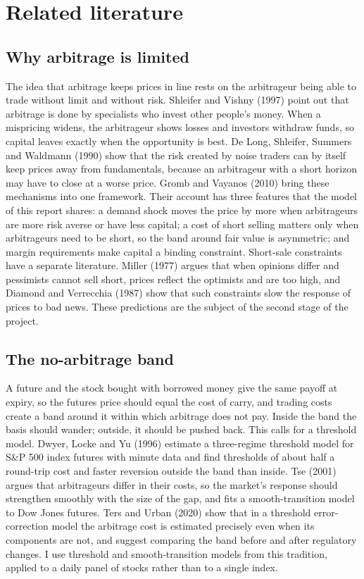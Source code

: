 \section{Related literature}\label{sec:lit}

\subsection{Why arbitrage is limited}
The idea that arbitrage keeps prices in line rests on the arbitrageur being able to trade without limit and without
risk. Shleifer and Vishny (1997) point out that arbitrage is done by specialists who invest other people's money. When a
mispricing widens, the arbitrageur shows losses and investors withdraw funds, so capital leaves exactly when the
opportunity is best. De Long, Shleifer, Summers and Waldmann (1990) show that the risk created by noise traders can by
itself keep prices away from fundamentals, because an arbitrageur with a short horizon may have to close at a worse
price. Gromb and Vayanos (2010) bring these mechanisms into one framework. Their account has three features that the
model of this report shares: a demand shock moves the price by more when arbitrageurs are more risk averse or have less
capital; a cost of short selling matters only when arbitrageurs need to be short, so the band around fair value is
asymmetric; and margin requirements make capital a binding constraint. Short-sale constraints have a separate literature.
Miller (1977) argues that when opinions differ and pessimists cannot sell short, prices reflect the optimists and are
too high, and Diamond and Verrecchia (1987) show that such constraints slow the response of prices to bad news. These
predictions are the subject of the second stage of the project.

\subsection{The no-arbitrage band}
A future and the stock bought with borrowed money give the same payoff at expiry, so the futures price should equal the
cost of carry, and trading costs create a band around it within which arbitrage does not pay. Inside the band the basis
should wander; outside, it should be pushed back. This calls for a threshold model. Dwyer, Locke and Yu (1996) estimate a
three-regime threshold model for S\&P 500 index futures with minute data and find thresholds of about half a round-trip
cost and faster reversion outside the band than inside. Tse (2001) argues that arbitrageurs differ in their costs, so
the market's response should strengthen smoothly with the size of the gap, and fits a smooth-transition model to Dow
Jones futures. Ters and Urban (2020) show that in a threshold error-correction model the arbitrage cost is estimated
precisely even when its components are not, and suggest comparing the band before and after regulatory changes. I use
threshold and smooth-transition models from this tradition, applied to a daily panel of stocks rather than to a single
index.


